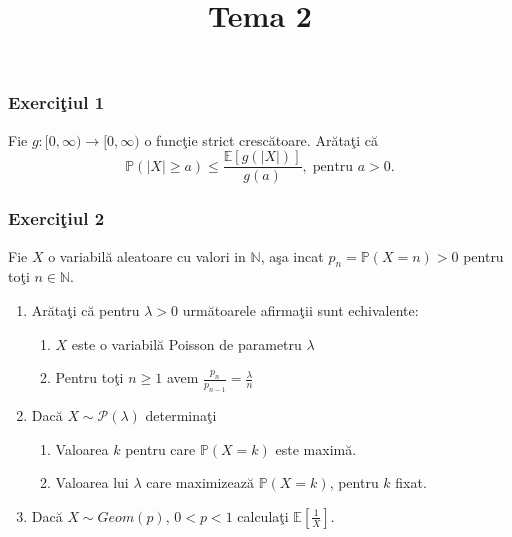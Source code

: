 \documentclass[]{article}
\title{Tema 2}
\author{}
\date{}
\def\l{{\lambda}}
\def\PP{{\mathbb P}}
\def\EE{{\mathbb E}}
\def\NN{{\mathbb N}}
\def\MP{{\mathcal P}}
\begin{document}
\maketitle

\thispagestyle{fancy}

\subsubsection{\texorpdfstring{Exerci\c tiul
1}{Exerciiul 1}}\label{exerciiul-1}

Fie \(g:[0,\infty)\to[0, \infty)\) o func\c tie strict cresc\u atoare.
Ar\u ata\c ti c\u a \[
  \PP\left(|X|\geq a\right)\leq\frac{\EE\left[g(|X|)\right]}{g(a)}, \; \mbox{pentru $a>0$.}
\]

\subsubsection{\texorpdfstring{Exerci\c tiul
2}{Exerciiul 2}}\label{exerciiul-2}

Fie \(X\) o variabil\u a aleatoare cu valori in \(\NN\), a\c sa incat
\(p_n=\PP(X=n)>0\) pentru to\c ti \(n\in\NN\).

\begin{enumerate}
\def\labelenumi{\alph{enumi})}
\item
  Ar\u ata\c ti c\u a pentru \(\l>0\) urm\u atoarele afirma\c tii sunt
  echivalente:

  \begin{enumerate}
  \def\labelenumii{\roman{enumii})}
  \item
    \(X\) este o variabil\u a Poisson de parametru \(\l\)
  \item
    Pentru to\c ti \(n\geq1\) avem \(\frac{p_n}{p_{n-1}}=\frac{\l}{n}\)
  \end{enumerate}
\item
  Dac\u a \(X\sim\MP(\l)\) determina\c ti

  \begin{enumerate}
  \def\labelenumii{\roman{enumii})}
  \item
    Valoarea \(k\) pentru care \(\PP(X=k)\) este maxim\u a.
  \item
    Valoarea lui \(\l\) care maximizeaz\u a \(\PP(X=k)\), pentru \(k\)
    fixat.
  \end{enumerate}
\item
  Dac\u a \(X\sim Geom(p)\), \(0<p<1\) calcula\c ti
  \(\EE\left[\frac{1}{X}\right]\).
\end{enumerate}
\end{document}
